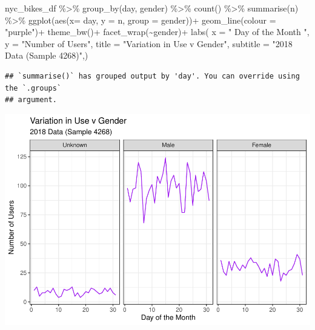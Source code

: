 \documentclass[
]{article}
\newenvironment{Shaded}{\begin{snugshade}}{\end{snugshade}}
\newcommand{\AttributeTok}[1]{\textcolor[rgb]{0.77,0.63,0.00}{#1}}
\newcommand{\FunctionTok}[1]{\textcolor[rgb]{0.00,0.00,0.00}{#1}}
\newcommand{\NormalTok}[1]{#1}
\newcommand{\SpecialCharTok}[1]{\textcolor[rgb]{0.00,0.00,0.00}{#1}}
\newcommand{\StringTok}[1]{\textcolor[rgb]{0.31,0.60,0.02}{#1}}
\begin{document}
\begin{Shaded}
\begin{Highlighting}[]
\NormalTok{nyc\_bikes\_df }\SpecialCharTok{\%\textgreater{}\%}
  \FunctionTok{group\_by}\NormalTok{(day, gender) }\SpecialCharTok{\%\textgreater{}\%}
  \FunctionTok{count}\NormalTok{() }\SpecialCharTok{\%\textgreater{}\%}
  \FunctionTok{summarise}\NormalTok{(n) }\SpecialCharTok{\%\textgreater{}\%}
  \FunctionTok{ggplot}\NormalTok{(}\FunctionTok{aes}\NormalTok{(}\AttributeTok{x=}\NormalTok{ day, }\AttributeTok{y =}\NormalTok{ n, }\AttributeTok{group =}\NormalTok{ gender))}\SpecialCharTok{+}
  \FunctionTok{geom\_line}\NormalTok{(}\AttributeTok{colour =} \StringTok{"purple"}\NormalTok{)}\SpecialCharTok{+}
  \FunctionTok{theme\_bw}\NormalTok{()}\SpecialCharTok{+}
\FunctionTok{facet\_wrap}\NormalTok{(}\SpecialCharTok{\textasciitilde{}}\NormalTok{gender)}\SpecialCharTok{+}
  \FunctionTok{labs}\NormalTok{(}
    \AttributeTok{x =} \StringTok{" Day of the Month "}\NormalTok{,}
    \AttributeTok{y =} \StringTok{"Number of Users"}\NormalTok{,}
    \AttributeTok{title =} \StringTok{"Variation in Use v Gender"}\NormalTok{,}
    \AttributeTok{subtitle =} \StringTok{"2018 Data (Sample 4268)"}\NormalTok{,)}
\end{Highlighting}
\end{Shaded}

\begin{verbatim}
## `summarise()` has grouped output by 'day'. You can override using the `.groups`
## argument.
\end{verbatim}

\includegraphics{nyc_bikes_presentation_janehogg_files/figure-latex/unnamed-chunk-15-1.pdf}
\end{document}
